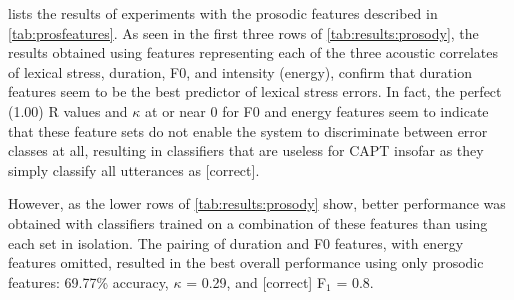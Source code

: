 \documentclass[a4paper]{article}
\begin{document}
		 lists the results of experiments with the prosodic features described in \cref{tab:prosfeatures}. As seen in the first three rows of \cref{tab:results:prosody}, the results obtained using features representing each of the three acoustic correlates of lexical stress, duration, F0, and intensity (energy), confirm that duration features seem to be the best predictor of lexical stress errors.%
		In fact, the perfect (1.00) R values and $\kappa$ at or near 0 for F0 and energy features seem to indicate that these feature sets do not enable the system to discriminate between error classes at all, resulting in classifiers that are useless for CAPT insofar as they simply classify all utterances as [correct].
		
		However, as the lower rows of \cref{tab:results:prosody} show, better performance was obtained with classifiers trained on a combination of these features than using each set in isolation. The pairing of duration and F0 features, with energy features omitted, resulted in the best overall performance using only prosodic features: 
		69.77\% accuracy, $\kappa$ = 0.29, and [correct] F$_1$ = 0.8.
		
\end{document}
